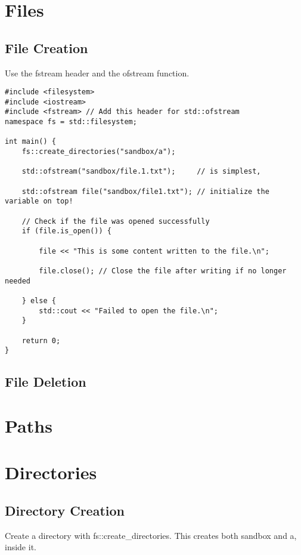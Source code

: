 \section{Files}

\subsection{File Creation}

Use the fstream header and the ofstream function.

\begin{verbatim}
#include <filesystem>
#include <iostream>
#include <fstream> // Add this header for std::ofstream
namespace fs = std::filesystem;

int main() {
    fs::create_directories("sandbox/a");

    std::ofstream("sandbox/file.1.txt");     // is simplest,

    std::ofstream file("sandbox/file1.txt"); // initialize the variable on top!

    // Check if the file was opened successfully
    if (file.is_open()) {

        file << "This is some content written to the file.\n";

        file.close(); // Close the file after writing if no longer needed

    } else {
        std::cout << "Failed to open the file.\n";
    }

    return 0;
}
\end{verbatim}


\subsection{File Deletion}

\section{Paths}

\section{Directories}

\subsection{Directory Creation}

Create a directory with fs::create\_directories. This creates both sandbox and a, inside it.

